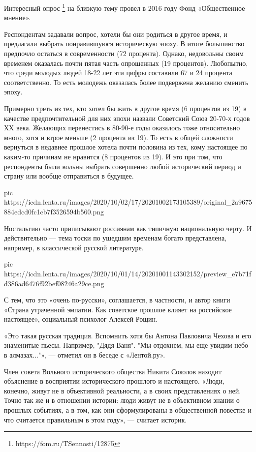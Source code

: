Интересный опрос \footnote{https://fom.ru/TSennosti/12875} на близкую тему
провел в 2016 году Фонд «Общественное мнение».

Респондентам задавали вопрос, хотели бы они родиться в другое время, и
предлагали выбрать понравившуюся историческую эпоху. В итоге большинство
предпочло остаться в современности (72 процента). Однако, недовольны своим
временем оказалась почти пятая часть опрошенных (19 процентов). Любопытно, что
среди молодых людей 18-22 лет эти цифры составили 67 и 24 процента
соответственно. То есть молодежь оказалась более подвержена желанию сменить
эпоху.

Примерно треть из тех, кто хотел бы жить в другое время (6 процентов из 19) в
качестве предпочтительной для них эпохи назвали Советский Союз 20-70-х годов ХХ
века. Желающих перенестись в 80-90-е годы оказалось тоже относительно много,
хотя и втрое меньше (2 процента из 19). То есть в общей сложности вернуться в
недавнее прошлое хотела почти половина из тех, кому настоящее по каким-то
причинам не нравится (8 процентов из 19). И это при том, что респонденты были
вольны выбрать совершенно любой исторический период и страну или вообще
отправиться в будущее.

\ifcmt
pic https://icdn.lenta.ru/images/2020/10/02/17/20201002173105389/original_2a9675884edcd0fc1cb7f3526594b560.png
\fi

Ностальгию часто приписывают россиянам как типичную национальную черту. И
действительно --- тема тоски по ушедшим временам богато представлена, например, в
классической русской литературе.

\ifcmt
pic https://icdn.lenta.ru/images/2020/10/01/14/20201001143302152/preview_e7b71fd386ad6476f92bef08246a29ce.png
\fi

С тем, что это «очень по-русски», соглашается, в частности, и автор книги
«Страна утраченной эмпатии. Как советское прошлое влияет на российское
настоящее», социальный психолог Алексей Рощин.

«Это такая русская традиция. Вспомнить хотя бы Антона Павловича Чехова и его
знаменитые пьесы. Например, "Дядя Ваня". "Мы отдохнем, мы еще увидим небо в
алмазах..."», --- отметил он в беседе с «Лентой.ру».

Член совета Вольного исторического общества Никита Соколов находит объяснение в
восприятии исторического прошлого и настоящего. «Люди, конечно, живут не в
объективной реальности, а в своих представлениях о ней. Точно так же и в
отношении истории: люди живут не в объективном знании о прошлых событиях, а в
том, как они сформулированы в общественной повестке и что считается правильным
в этом году», --- считает историк.

